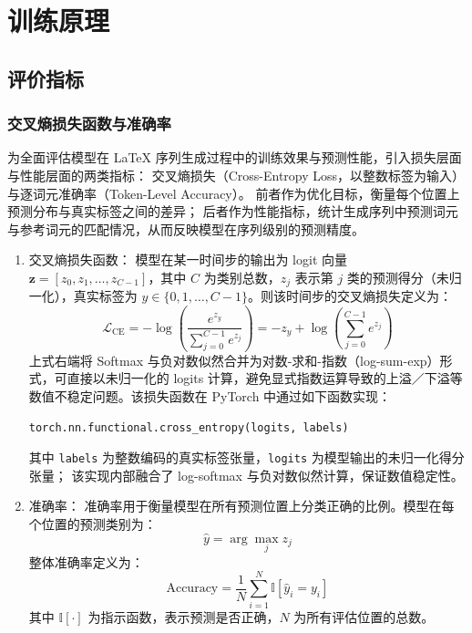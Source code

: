 \section{训练原理}
\subsection{评价指标}
\subsubsection{交叉熵损失函数与准确率}
为全面评估模型在 LaTeX 序列生成过程中的训练效果与预测性能，引入损失层面与性能层面的两类指标：
交叉熵损失（Cross-Entropy Loss，以整数标签为输入）与逐词元准确率（Token-Level Accuracy）。
前者作为优化目标，衡量每个位置上预测分布与真实标签之间的差异；
后者作为性能指标，统计生成序列中预测词元与参考词元的匹配情况，从而反映模型在序列级别的预测精度。
\begin{enumerate}[label={（\arabic*）}, leftmargin=2em, labelsep=0.5em, itemsep=0pt]
    \item 交叉熵损失函数：
    模型在某一时间步的输出为 logit 向量 $\boldsymbol{z} = [z_0, z_1, \dots, z_{C-1}]$，其中 $C$ 为类别总数，$z_j$ 表示第 $j$ 类的预测得分（未归一化），真实标签为 $y \in \{0, 1, \dots, C{-}1\}$。则该时间步的交叉熵损失定义为：
    \begin{equation}
    \mathcal{L}_{\text{CE}} = -\log \left( \frac{e^{z_{y}}}{\sum_{j=0}^{C-1} e^{z_j}} \right) = -z_{y} + \log\left( \sum_{j=0}^{C-1} e^{z_j} \right)
    \end{equation}
    上式右端将 Softmax 与负对数似然合并为对数-求和-指数（log-sum-exp）形式，可直接以未归一化的 logits 计算，避免显式指数运算导致的上溢／下溢等数值不稳定问题。该损失函数在 PyTorch 中通过如下函数实现：
    \begin{center}
        \texttt{torch.nn.functional.cross\_entropy(logits, labels)}
    \end{center}
    其中 \texttt{labels} 为整数编码的真实标签张量，\texttt{logits} 为模型输出的未归一化得分张量；
    该实现内部融合了 log-softmax 与负对数似然计算，保证数值稳定性。
    \item 准确率：
    准确率用于衡量模型在所有预测位置上分类正确的比例。模型在每个位置的预测类别为：
    \begin{equation}
    \hat{y} = \arg\max_{j} z_j
    \end{equation}
    整体准确率定义为：
    \begin{equation}
    \text{Accuracy} = \frac{1}{N} \sum_{i=1}^{N} \mathbb{I}[\hat{y}_i = y_i]
    \end{equation}
    其中 $\mathbb{I}[\cdot]$ 为指示函数，表示预测是否正确，$N$ 为所有评估位置的总数。
\end{enumerate}
